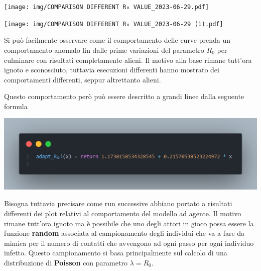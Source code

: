 \begin{minipage}{\linewidth}
    \centering
    \texttt{[image: img/COMPARISON DIFFERENT R₀ VALUE\_2023-06-29.pdf]}
    \label{fig:strange_behaviour_R0_abm}
\end{minipage}

\begin{minipage}{\linewidth}
    \centering
    \texttt{[image: img/COMPARISON DIFFERENT R₀ VALUE\_2023-06-29 (1).pdf]}
    \label{fig:strange_behaviour_R0_ode}
\end{minipage}

Si può facilmente osservare come il comportamento delle curve prenda un comportamento 
anomalo fin dalle prime variazioni del parametro $R_0$ per culminare con risultati 
completamente alieni. Il motivo alla base rimane tutt'ora ignoto e sconosciuto, tuttavia
esecuzioni differenti hanno mostrato dei comportamenti differenti, seppur altrettanto 
alieni. 

Questo comportamento però può essere descritto a grandi linee dalla seguente formula

\begin{minipage}{\linewidth}
    \centering
    \includegraphics[width=\textwidth]{img/rapporto_strano.png}
    \label{fig:strange_behaviour_R0}
\end{minipage}

Bisogna tuttavia precisare come run successive abbiano portato a risultati differenti dei plot 
relativi al comportamento del modello ad agente. Il motivo rimane tutt'ora ignoto ma è possibile
che uno degli attori in gioco possa essere la funzione \textbf{random} associata al campionamento 
degli individui che va a fare da mimica per il numero di contatti che avvengono ad ogni passo 
per ogni individuo infetto. Questo campionamento si basa principalmente sul calcolo di una 
distribuzione di \textbf{Poisson} \cite{wiki:Distribuzione_di_Poisson} con parametro $\lambda = R_0$.

